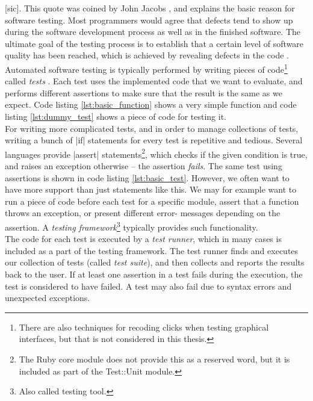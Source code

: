 \MakeShortVerb{\|}

 [sic].
This quote was coined by John Jacobs \cite{web:quote_jacobs}, and
explains the basic reason for software testing. Most programmers would
agree that defects tend to show up during the software development
process as well as in the finished software. The ultimate goal of the
testing process is to establish that a certain level of software quality
has been reached, which is achieved by revealing defects in the code
\cite{book:adp}.\\

Automated software testing is typically performed by writing pieces of
code\footnote{There are also techniques for recoding clicks when testing
graphical interfaces, but that is not considered in this thesis.}
called \emph{tests} \cite{wiki:test_automation}. Each test uses the
implemented code that we want to evaluate, and performs different
assertions to make sure that the result is the same as we expect. Code
listing \ref{lst:basic_function} shows a very simple function and code
listing \ref{lst:dummy_test} shows a piece of code for testing it.\\

For writing more complicated tests, and in order to manage collections
of tests, writing a bunch of |if| statements for every test is
repetitive and tedious. Several languages provide |assert|
statements\footnote{The Ruby core module does not provide this as a
reserved word, but it is included as part of the Test::Unit module.},
which checks if the given condition is true, and raises an exception
otherwise -- the assertion \emph{fails}. The same test using assertions
is shown in code listing \ref{lst:basic_test}. However, we often want to
have more support than just statements like this. We may for example
want to run a piece of code before each test for a specific module,
assert that a function throws an exception, or present different error-
messages depending on the assertion. A \emph{testing
framework}\footnote{Also called testing tool.} typically provides such
functionality. \cite{wiki:test_automation}\\

The code for each test is executed by a \emph{test runner}, which in
many cases is included as a part of the testing framework. The test
runner finds and executes our collection of tests (called \emph{test
suite}), and then collects and reports the results back to the user. If
at least one assertion in a test fails during the execution, the test is
considered to have failed. A test may also fail due to syntax errors and
unexpected exceptions.\\


